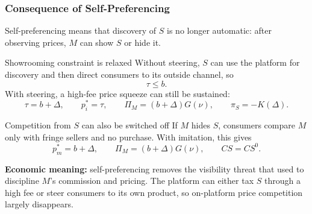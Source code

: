 \begin{frame}
  \frametitle{Consequence of Self-Preferencing}
  \footnotesize
  Self-preferencing means that discovery of $S$ is no longer automatic:
  after observing prices, $M$ can show $S$ or hide it.

  \begin{block}{Showrooming constraint is relaxed}
    Without steering, $S$ can use the platform for discovery and then direct
    consumers to its outside channel, so
    \begin{equation}
      \tau\leq b .
    \end{equation}
    With steering, a high-fee price squeeze can still be sustained:
    \begin{equation}
      \tau=b+\Delta,\qquad p_i^*=\tau,\qquad
      \Pi_M=(b+\Delta)G(\nu),\qquad \pi_S=-K(\Delta).
    \end{equation}
  \end{block}

  \begin{block}{Competition from $S$ can also be switched off}
    If $M$ hides $S$, consumers compare $M$ only with fringe sellers and no
    purchase. With imitation, this gives
    \begin{equation}
      p_m^*=b+\Delta,\qquad
      \Pi_M=(b+\Delta)G(\nu),\qquad
      CS=CS^0 .
    \end{equation}
  \end{block}

  \textbf{Economic meaning:} self-preferencing removes the visibility threat
  that used to discipline $M$'s commission and pricing. The platform can either
  tax $S$ through a high fee or steer consumers to its own product, so
  on-platform price competition largely disappears.
\end{frame}


